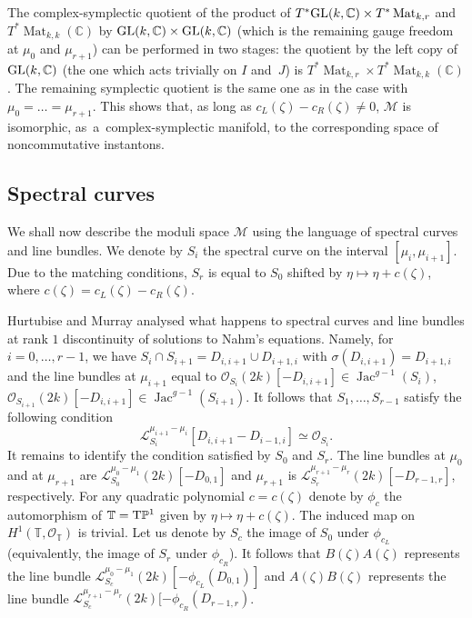 \documentclass[pdftex]{sigma}
\newcommand{\cx}{{\mathbb C}}
\newcommand{\Jac}{\operatorname{Jac}}
\newcommand{\Mat}{\operatorname{Mat}}
\numberwithin{equation}{section}
\newcommand{\oP}{{\mathbb{P}}}
\newcommand{\oT}{{\mathbb{T}}}
\newcommand{\sM}{{\mathcal{M}}} %
\newcommand{\sO}{{\mathcal{O}}}
\begin{document}
{The complex-symplectic quotient of the product of $T^\ast {\rm GL}(k,\cx)\times T^\ast\Mat_{k,r}$ and $T^\ast \Mat_{k,k}(\cx)$ by ${\rm GL}(k,\cx)\times {\rm GL}(k,\cx)$ (which is the remaining gauge freedom at $\mu_0$ and $\mu_{r+1}$)
 can be performed in two stages: the quotient by the left copy of ${\rm GL}(k,\cx)$ (the one which acts trivially on $I$ and~$J$) is $T^\ast\Mat_{k,r}\times T^\ast \Mat_{k,k}(\cx)$.
The remaining symplectic quotient is the
same one as in the case with
$\mu_0=\dots=\mu_{r+1}$. This shows that, as long as $c_L(\zeta)-c_R(\zeta)\neq 0$, $\sM$ is isomorphic, as~a~complex-symplectic manifold,
to the corresponding space of noncommutative instantons.

\subsection{Spectral curves}
We shall now describe the moduli space $\sM$ using the language of spectral curves and line bundles.
 We denote by $S_i$ the spectral curve on the interval $[\mu_{i},\mu_{i+1}]$. Due to the matching conditions, $S_{r}$ is equal to $S_0$ shifted by $\eta\mapsto \eta+ c(\zeta)$, where $c(\zeta)=c_L(\zeta)-c_R(\zeta)$.
\par
Hurtubise and Murray \cite{HM} analysed what happens to spectral curves and line bundles at rank $1$ {discontinuity} of solutions to Nahm's equations. Namely, for $i=0,\dots,r-1$, we have $S_i\cap S_{i+1}=D_{i,i+1}\cup D_{i+1,i}$ with $\sigma(D_{i,i+1})=D_{i+1,i}$ and the line bundles at $\mu_{i+1}$ equal to $\sO_{S_i}(2k)[-D_{i,i+1}]\in \Jac^{g-1}(S_i)$, $\sO_{S_{i+1}}(2k)[-D_{i,i+1}]\in \Jac^{g-1}(S_{i+1})$. It follows that $S_1,\dots,S_{r-1}$ satisfy the following condition
\begin{equation} \mathscr{L}_{S_i}^{\mu_{i+1}-\mu_{i}}[D_{i,i+1}-D_{i-1,i}]\simeq \sO_{S_i}.\label{triviality}
\end{equation}
It remains to identify the condition satisfied by $S_0$ and $S_{r}$. The line bundles at $\mu_0$ and
at $\mu_{r+1}$ are
 $\mathscr{L}_{S_0}^{\mu_0-\mu_1}(2k)[-D_{0,1}]$  and $\mu_{r+1}$ is $\mathscr{L}_{S_{r}}^{\mu_{r+1}-\mu_r}(2k)[-D_{r-1,r}]$, respectively.
 For any quadratic polynomial $c=c(\zeta)$ denote by $\phi_c$ the automorphism of $\oT={\rm T}\oP^1$ given by $\eta\mapsto \eta+ c(\zeta)$. The induced map on $H^1(\oT,\sO_{\oT})$ is trivial. Let us denote by $S_c$ the image of $S_0$ under $\phi_{c_L}$ (equivalently, the image of $S_{r}$ under $\phi_{c_R}$). It follows that $B(\zeta)A(\zeta)$ represents the line bundle $\mathscr{L}_{S_c}^{\mu_0-\mu_1}(2k)[-\phi_{c_L}(D_{0,1})]$ and $A(\zeta)B(\zeta)$ represents the line bundle $\mathscr{L}_{S_c}^{\mu_{r+1}-\mu_r}(2k)[-\phi_{c_R}(D_{r-1,r})$.
}
\end{document}
